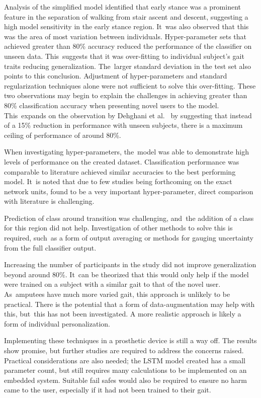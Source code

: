 Analysis of the simplified model identified that early stance was a prominent feature in the separation of walking from stair ascent and descent, suggesting a high model sensitivity in the early stance region. It~was also observed that this was the area of most variation between individuals. Hyper-parameter sets that achieved greater than 80\% accuracy reduced the performance of the classifier on unseen data. This~suggests that it was over-fitting to individual subject's gait traits reducing generalization. The~larger standard deviation in the test set also points to this conclusion. Adjustment of hyper-parameters and standard regularization techniques alone were not sufficient to solve this over-fitting. These two observations may begin to explain the challenges in achieving greater than 80\% classification accuracy when presenting novel users to the model. This~expands on the observation by Dehghani et al.~\cite{Dehghani2019} by suggesting that instead of a 15\% reduction in performance with unseen subjects, there is a maximum ceiling of performance of around 80\%.

When investigating hyper-parameters, the~model was able to demonstrate high levels of performance on the created dataset. Classification performance was comparable to literature achieved similar accuracies to the best performing model. It~is noted that due to few studies being forthcoming on the exact network units, found to be a very important hyper-parameter, direct comparison with literature is challenging.

Prediction of class around transition was challenging, and~the addition of a class for this region did not help. Investigation of other methods to solve this is required, such~as a form of output averaging or methods for gauging uncertainty from the full classifier output.

Increasing the number of participants in the study did not improve generalization beyond around 80\%. It~can be theorized that this would only help if the model were trained on a subject with a similar gait to that of the novel user. As~amputees have much more varied gait, this approach is unlikely to be practical. There is the potential that a form of data-augmentation may help with this, but~this has not been investigated. A more realistic approach is likely a form of individual personalization.

Implementing these techniques in a prosthetic device is still a way off. The results show promise, but further studies are required to address the concerns raised. Practical considerations are also needed; the LSTM model created has a small parameter count, but still requires many calculations to be implemented on an embedded system. Suitable fail safes would also be required to ensure no harm came to the user, especially if it had not been trained to their gait.

